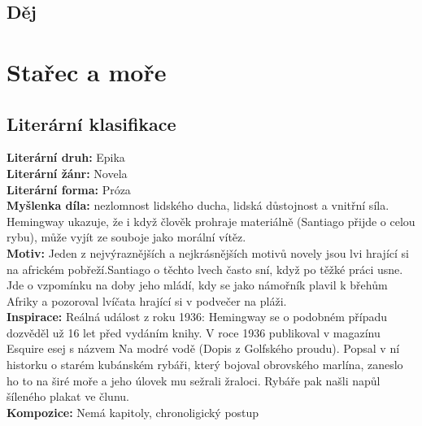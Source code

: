 \documentclass[12pt, a4paper]{article}
\newcommand{\mybf}[1]{\textcolor[RGB]{0, 179, 219}{\textbf{#1}}}
\begin{document}
{\color{subsectioncolor}\hrulefill}
\subsection*{\color{subsectioncolor}Děj}

\newpage

\section{Stařec a moře}

\subsection*{Literární klasifikace}
\mybf{Literární druh:} Epika\\[3pt]
\mybf{Literární žánr:} Novela\\[3pt]
\mybf{Literární forma:} Próza\\[3pt]
\mybf{Myšlenka díla:} nezlomnost lidského ducha, lidská důstojnost a vnitřní síla. Hemingway ukazuje, že i když člověk prohraje materiálně (Santiago přijde o celou rybu), může vyjít ze souboje jako morální vítěz.\\[10pt]
\mybf{Motiv:} Jeden z nejvýraznějších a nejkrásnějších motivů novely jsou lvi hrající si na africkém pobřeží.Santiago o těchto lvech často sní, když po těžké práci usne. Jde o vzpomínku na doby jeho mládí, kdy se jako námořník plavil k břehům Afriky a pozoroval lvíčata hrající si v podvečer na pláži.\\[10pt]
\mybf{Inspirace:} Reálná událost z roku 1936: Hemingway se o podobném případu dozvěděl už 16 let před vydáním knihy. V roce 1936 publikoval v magazínu Esquire esej s názvem Na modré vodě (Dopis z Golfského proudu). Popsal v ní historku o starém kubánském rybáři, který bojoval obrovského marlína, zaneslo ho to na širé moře a jeho úlovek mu sežrali žraloci. Rybáře pak našli napůl šíleného plakat ve člunu.\\[10pt]
\mybf{Kompozice:} Nemá kapitoly, chronoligický postup
\end{document}
